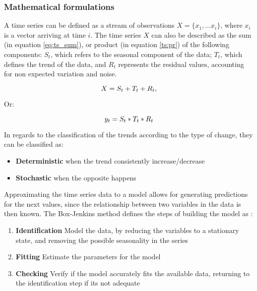 \subsubsection {Mathematical formulations} \label{sec:math_form}

A time series can be defined as a stream of observations $X = \{x_1, ... x_i\}$, where $x_i$ is a vector arriving at time $i$. The time series $X$ can also be
described as the sum (in equation \ref{eq:ts_sum}), or product (in equation \ref{ts:pr}) of the following components: $S_t$, which refers to the seasonal component
of the data; $T_t$, which defines the trend of the data, and $R_t$ represents the residual values, accounting for non expected variation and noise.

\begin {equation}
\centering
X = S_t + T_t + R_t
\label{eq:ts_sum},
\end {equation}

Or:

\begin {equation}
\centering
y_t = S_t * T_t * R_t
\label{ts:pr}
\end {equation}

\par In regards to the classification of the trends according to the type of change, they can be classified as:

\begin {itemize}
  \item \textbf {Deterministic} when the trend consistently increase/decrease
  \item \textbf {Stochastic} when the opposite happens
\end {itemize}

\par Approximating the time series data to a model allows for generating predictions for the next values, since the relationship between two variables in the data is
then known. The Box-Jenkins method defines the steps of building the model as \cite{box_time_2016}:

\begin {enumerate}
  \item \textbf{Identification} Model the data, by reducing the variables to a stationary state, and removing the possible seasonality in the series
  \item \textbf{Fitting} Estimate the parameters for the model
  \item \textbf{Checking} Verify if the model accurately fits the available data, returning to the identification step if its not adequate
\end {enumerate}

